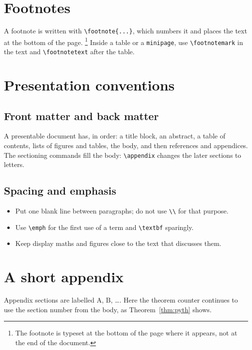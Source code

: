 \documentclass[11pt,a4paper]{article}
\theoremstyle{plain}                         %
\theoremstyle{definition}                    %
\theoremstyle{remark}                        %
\begin{document}
\section{Footnotes}

A footnote is written with \verb|\footnote{...}|, which numbers it
and places the text at the bottom of the page.%
\footnote{The footnote is typeset at the bottom of the page where it
appears, not at the end of the document.}
Inside a table or a \texttt{minipage}, use \verb|\footnotemark| in the
text and \verb|\footnotetext| after the table.

\section{Presentation conventions}

\subsection{Front matter and back matter}

A presentable document has, in order: a title block, an abstract, a
table of contents, lists of figures and tables, the body, and then
references and appendices. The sectioning commands fill the body:
\verb|\appendix| changes the later sections to letters.

\subsection{Spacing and emphasis}

\begin{itemize}
  \item Put one blank line between paragraphs; do not use \verb|\\| for
    that purpose.
  \item Use \verb|\emph| for the first use of a term and
    \verb|\textbf| sparingly.
  \item Keep display maths and figures close to the text that discusses
    them.
\end{itemize}

\appendix
\section{A short appendix}

Appendix sections are labelled A, B, \ldots. Here the theorem counter
continues to use the section number from the body, as
Theorem~\ref{thm:pyth} shows.
\end{document}
